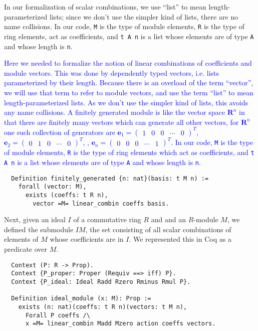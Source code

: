 \documentclass{article}
\begin{document}
In our formalization of scalar combinations, 
we use  ``list'' to mean length-parameterized lists; since we don't use the simpler
kind of lists, there are no name collisions.
In our code, \texttt{M} is the type of module elements, \texttt{R} is the type of ring
elements,  act as coefficients, and \texttt{t A n} is a list whose elements
are of type \texttt{A} and whose length is \texttt{n}.


\textcolor{blue}{Here we needed to formalize the notion of linear combinations of
coefficients and module vectors. This was done by dependently typed vectors,
i.e. lists parameterized by their length. Because there is an overload of the
term ``vector'', we will use that term to refer to module vectors, and use the
term ``list'' to mean length-parameterized lists. As we don't use the simpler
kind of lists, this avoids any name collisions. A finitely generated module is
like the vector space \(\mathbf{R}^{n}\) in that there are finitely many
vectors which can generate all other vectors, for \(\mathbf{R}^{n}\) one such
collection of generators are \(\mathbf{e}_{1} = \begin{pmatrix} 1 & 0 & 0 &
  \cdots & 0\end{pmatrix}^{T}\), \(\mathbf{e}_{2} = \begin{pmatrix} 0 & 1 & 0 &
  \cdots & 0\end{pmatrix}^{T}\), \textellipsis, \(\mathbf{e}_{n} =
  \begin{pmatrix} 0 & 0 & 0 & \cdots & 1\end{pmatrix}^{T}\). In our code,
\texttt{M} is the type of module elements, \texttt{R} is the type of ring
elements which act as coefficients, and \texttt{t A n} is a list whose elements
are of type \texttt{A} and whose length is \texttt{n}.
}

\begin{verbatim}
  Definition finitely_generated {n: nat}(basis: t M n) :=
    forall (vector: M),
      exists (coeffs: t R n),
        vector =M= linear_combin coeffs basis.
\end{verbatim}



Next, given an ideal \(I\) of a commutative ring $R$ and and an $R$-module \(M\), 
we defined the submodule $IM$, the set consisting of all scalar combinations of elements of \(M\) whose coefficients are in  \(I\). We represented this in Coq as a predicate over \(M\).

\begin{verbatim}
  Context (P: R -> Prop).
  Context {P_proper: Proper (Requiv ==> iff) P}.
  Context {P_ideal: Ideal Radd Rzero Rminus Rmul P}.
  
  Definition ideal_module (x: M): Prop :=
    exists (n: nat)(coeffs: t R n)(vectors: t M n),
      Forall P coeffs /\
      x =M= linear_combin Madd Mzero action coeffs vectors.
\end{verbatim}
\end{document}
